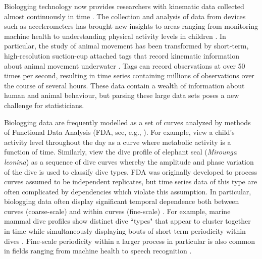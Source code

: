
Biologging technology now provides researchers with kinematic data collected almost continuously in time \citep{Hooten:2017}.
The collection and analysis of data from devices such as accelerometers has brought new insights to areas ranging from monitoring machine health \citep{Getman:2009} to understanding physical activity levels in children \citep{Morris:2007}. In particular, the study of animal movement has been transformed by short-term, high-resolution suction-cup attached tags that record kinematic information about animal movement underwater \citep{Borger:2020,Dot:2016b}. Tags can record observations at over 50 times per second, resulting in time series containing millions of observations over the course of several hours. These data contain a wealth of information about human and animal behaviour, but parsing these large data sets poses a new challenge for statisticians.

Biologging data are frequently modelled as a set of curves analyzed by methods of Functional Data Analysis (FDA, see, e.g., \citet{Ramsay:2005}). For example, \citet{Morris:2007} view a child's activity level throughout the day as a curve where metabolic activity is a function of time. Similarly, \citet{Fu:2017} view the dive profile of elephant seal (\textit{Mirounga leonina}) as a sequence of dive curves whereby the amplitude and phase variation of the dive is used to classify dive types.
%
FDA was originally developed to process curves assumed to be independent replicates, but time series data of this type are often complicated by dependencies which violate this assumption. In particular, biologging data often display significant temporal dependence both between curves (coarse-scale) and within curves (fine-scale) \citep{Barajas:2017}.
For example, marine mammal dive profiles show distinct dive ``types" that appear to cluster together in time  \citep{Tennessen:2019b} while simultaneously displaying bouts of short-term periodicity within dives \citep{Adam:2019}. Fine-scale periodicity within a larger process in particular is also common in fields ranging from machine health \citep{Xin:2018,Lucero:2019} to speech recognition \citep{Juang:1991}.

